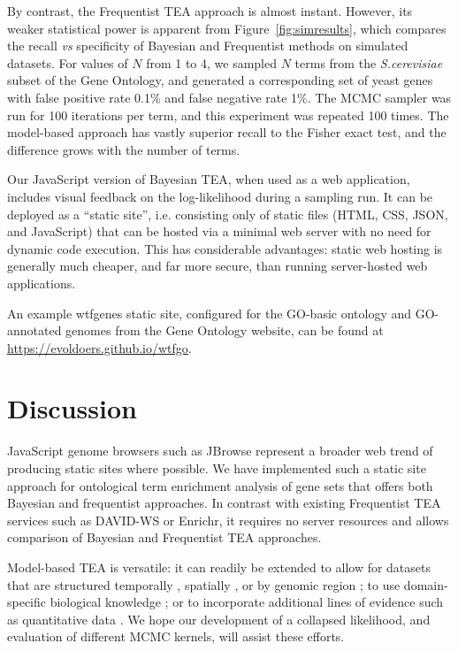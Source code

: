 By contrast, the Frequentist TEA approach is almost instant.
However, its weaker statistical power is apparent from Figure~\ref{fig:simresults},
which compares the recall {\em vs} specificity of Bayesian and Frequentist methods
on simulated datasets. For values of $N$ from 1 to 4, we sampled $N$ terms
from the {\em S.cerevisiae} subset of the Gene Ontology,
and generated a corresponding set of yeast genes with false positive rate 0.1\% and false negative rate 1\%.
The MCMC sampler was run for 100 iterations per term, and this experiment was repeated 100 times.
The model-based approach has vastly superior recall to the Fisher exact test, and the difference
grows with the number of terms.

Our JavaScript version of Bayesian TEA, when used as a web application, includes visual feedback on the log-likelihood during a sampling run.
It can be deployed as a ``static site'',
i.e. consisting only of static files (HTML, CSS, JSON, and JavaScript) that can be hosted via a minimal web server with no need for dynamic code execution.
This has considerable advantages: static web hosting is generally much cheaper, and far more secure, than running server-hosted web applications.

An example wtfgenes static site, configured for the GO-basic ontology and GO-annotated genomes from the Gene Ontology website,
can be found at \url{https://evoldoers.github.io/wtfgo}.

\section*{Discussion}

JavaScript genome browsers such as JBrowse \citep{pmid27072794}
represent a broader web trend of producing static sites where possible.
We have implemented such a static site approach for ontological term enrichment analysis of gene sets that offers both Bayesian and frequentist approaches.
In contrast with existing Frequentist TEA services such as DAVID-WS or Enrichr,
it requires no server resources and allows comparison of Bayesian and Frequentist TEA approaches.

Model-based TEA is versatile: it can readily be extended
to allow for datasets that are structured
temporally \citep{pmid26111374},
spatially \citep{pmid26877824},
or by genomic region \citep{pmid20436461};
to use domain-specific biological knowledge \citep{pmid24675718};
or to incorporate additional lines of evidence such as quantitative data \citep{pmid21599902}.
We hope our development of a collapsed likelihood, and evaluation of different MCMC kernels, will assist these efforts.

